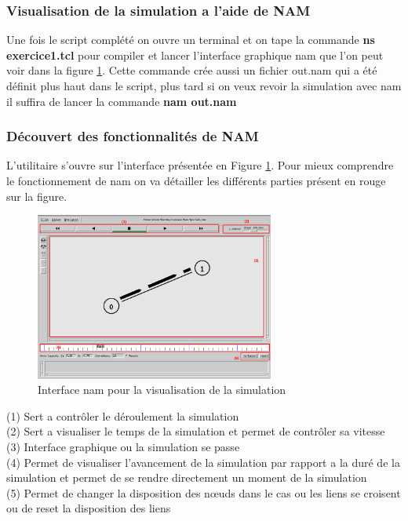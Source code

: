 \documentclass[11pt]{article}
\begin{document}
\subsubsection{Visualisation de la simulation a l'aide de NAM}
Une fois le script complété on ouvre un terminal et on tape la commande \textbf{ns exercice1.tcl} pour compiler et lancer l'interface graphique nam que l'on peut voir dans la figure \ref{namVisu}. Cette commande crée aussi un fichier out.nam qui a été définit plus haut dans le script, plus tard si on veux revoir la simulation avec nam il suffira de lancer la commande \textbf{nam out.nam}


\subsubsection{Découvert des fonctionnalités de NAM}
L'utilitaire s'ouvre sur l'interface présentée en Figure \ref{namVisu}. Pour mieux comprendre le fonctionnement de nam on va détailler les différents parties présent en rouge sur la figure.

\begin{figure}[H]
	\begin{center}
		\includegraphics[width=0.7\textwidth]{assets/tp1/nam-visualisation1.png}
	\end{center}
	\caption{Interface nam pour la visualisation de la simulation}
	\label{namVisu}
\end{figure}

\noindent
(1) Sert a contrôler le déroulement la simulation \\
(2) Sert a visualiser le temps de la simulation et permet de contrôler sa vitesse\\
(3) Interface graphique ou la simulation se passe \\
(4) Permet de visualiser l'avancement de la simulation par rapport a la duré de la simulation et permet de se rendre directement un moment de la simulation\\
(5) Permet de changer la disposition des nœuds dans le cas ou les liens se croisent ou de reset la disposition des liens\\
\end{document}
